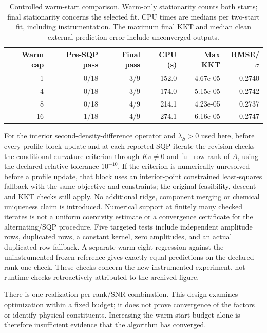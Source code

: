 \begin{table}[htbp]\centering\small
\caption{Controlled warm-start comparison. Warm-only stationarity counts both
starts; final stationarity concerns the selected fit. CPU times are medians per
two-start fit, including instrumentation. The maximum final KKT and median clean
external prediction error include unconverged outputs.}
\begin{tabular}{rrrrrr}\toprule
Warm cap & Pre-SQP pass & Final pass & CPU (s) & Max KKT & RMSE/$\sigma$\\\midrule
1 & 0/18 & 3/9 & 152.0 & 4.67e-05 & 0.2740 \\
4 & 0/18 & 3/9 & 174.0 & 5.15e-05 & 0.2742 \\
8 & 0/18 & 4/9 & 214.1 & 4.23e-05 & 0.2737 \\
16 & 1/18 & 4/9 & 274.1 & 6.16e-05 & 0.2747 \\
\bottomrule\end{tabular}\end{table}

For the interior second-density-difference operator and $\lambda_S>0$ used
here, before every profile-block update and at each reported SQP iterate the revision checks
the conditional curvature criterion through $Kv\ne0$ and full row rank of $A$,
using the declared relative tolerance $10^{-10}$. If the criterion is numerically
unresolved before a profile update, that block uses an interior-point constrained
least-squares fallback with the same objective and constraints; the original
feasibility, descent and KKT checks still apply. No additional ridge, component
merging or chemical uniqueness claim is introduced. Numerical support at finitely
many checked iterates is not a uniform coercivity estimate or a convergence
certificate for the alternating/SQP procedure. Five targeted tests include
independent amplitude rows, duplicated rows, a constant kernel, zero amplitudes,
and an actual duplicated-row fallback. A separate warm-eight regression against
the uninstrumented frozen reference gives exactly equal predictions on the
declared rank-one check. These checks concern the new instrumented experiment,
not runtime checks retroactively attributed to the archived figure.

There is one realization per rank/SNR combination. This design examines
optimization within a fixed budget; it does not prove convergence of the factors
or identify physical constituents. Increasing the warm-start budget alone is
therefore insufficient evidence that the algorithm has converged.


